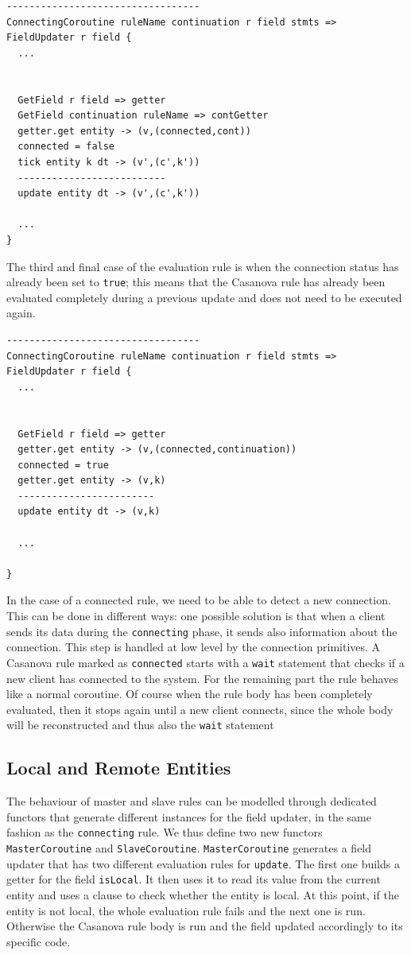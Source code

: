 \begin{lstlisting}
----------------------------------
ConnectingCoroutine ruleName continuation r field stmts => FieldUpdater r field {
  ...
  
  
  GetField r field => getter
  GetField continuation ruleName => contGetter
  getter.get entity -> (v,(connected,cont))
  connected = false
  tick entity k dt -> (v',(c',k'))
  --------------------------
  update entity dt -> (v',(c',k'))
  
  ...
}
\end{lstlisting}

\noindent
The third and final case of the evaluation rule is when the connection status has already been set to \texttt{true}; this means that the Casanova rule has already been evaluated completely during a previous update and does not need to be executed again.\\

\begin{lstlisting}
----------------------------------
ConnectingCoroutine ruleName continuation r field stmts => FieldUpdater r field {
  ...
  

  GetField r field => getter
  getter.get entity -> (v,(connected,continuation))
  connected = true
  getter.get entity -> (v,k)
  ------------------------
  update entity dt -> (v,k)
  
  ...

} 
\end{lstlisting}

\noindent
In the case of a connected rule, we need to be able to detect a new connection. This can be done in different ways: one possible solution is that when a client sends its data during the \texttt{connecting} phase, it sends also information about the connection. This step is handled at low level by the connection primitives. A Casanova rule marked as \texttt{connected} starts with a \texttt{wait} statement that checks if a new client has connected to the system. For the remaining part the rule behaves like a normal coroutine. Of course when the rule body has been completely evaluated, then it stops again until a new client connects, since the whole body will be reconstructed and thus also the \texttt{wait} statement

\subsection{Local and Remote Entities}
\label{subsec:ch_networking_local_and_remote}
The behaviour of master and slave rules can be modelled through dedicated functors that generate different instances for the field updater, in the same fashion as the \texttt{connecting} rule. We thus define two new functors \texttt{MasterCoroutine} and \texttt{SlaveCoroutine}. \texttt{MasterCoroutine} generates a field updater that has two different evaluation rules for \texttt{update}. The first one builds a getter for the field \texttt{\tu\tu isLocal}. It then uses it to read its value from the current entity and uses a clause to check whether the entity is local. At this point, if the entity is not local, the whole evaluation rule fails and the next one is run. Otherwise the Casanova rule body is run and the field updated accordingly to its specific code.

